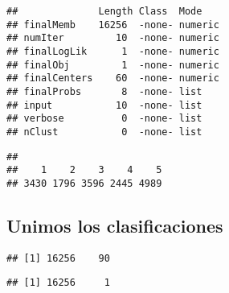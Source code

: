 \documentclass[11pt,]{article}
\newenvironment{Shaded}{\begin{snugshade}}{\end{snugshade}}
\newcommand{\KeywordTok}[1]{\textcolor[rgb]{0.13,0.29,0.53}{\textbf{#1}}}
\newcommand{\DecValTok}[1]{\textcolor[rgb]{0.00,0.00,0.81}{#1}}
\newcommand{\StringTok}[1]{\textcolor[rgb]{0.31,0.60,0.02}{#1}}
\newcommand{\OperatorTok}[1]{\textcolor[rgb]{0.81,0.36,0.00}{\textbf{#1}}}
\newcommand{\NormalTok}[1]{#1}
\begin{document}
\begin{verbatim}
##              Length Class  Mode   
## finalMemb    16256  -none- numeric
## numIter         10  -none- numeric
## finalLogLik      1  -none- numeric
## finalObj         1  -none- numeric
## finalCenters    60  -none- numeric
## finalProbs       8  -none- list   
## input           10  -none- list   
## verbose          0  -none- list   
## nClust           0  -none- list
\end{verbatim}

\begin{Shaded}
\end{Shaded}

\begin{verbatim}
## 
##    1    2    3    4    5 
## 3430 1796 3596 2445 4989
\end{verbatim}

\subsection{Unimos los
clasificaciones}\label{unimos-los-clasificaciones}

\begin{Shaded}
\end{Shaded}

\begin{verbatim}
## [1] 16256    90
\end{verbatim}

\begin{Shaded}
\end{Shaded}

\begin{verbatim}
## [1] 16256     1
\end{verbatim}
\end{document}
